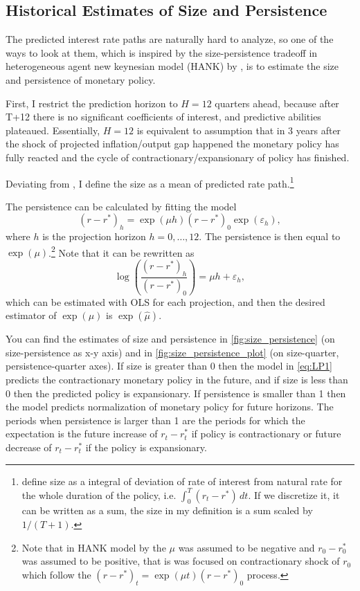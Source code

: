 \documentclass[11pt]{article}
\begin{document}
\subsection{Historical Estimates of Size and Persistence}
\label{sec:size_persistence}


The predicted interest rate paths are naturally hard to analyze, so one of the ways to look at them, which is inspired by the size-persistence tradeoff in heterogeneous agent new keynesian model (HANK) by \citet{KMV2018}, is to estimate the size and persistence of monetary policy. 

First, I restrict the prediction horizon to $H=12$ quarters ahead, because after T+12 there is no significant coefficients of interest, and predictive abilities plateaued. 
Essentially, $H=12$ is equivalent to assumption that in 3 years after the shock of projected inflation/output gap happened the monetary policy has fully reacted and the cycle of contractionary/expansionary of policy has finished.

Deviating from \citet{KMV2018}, I define the size as a mean of predicted rate path.\footnote{\citet{KMV2018} define size as a integral of deviation of rate of interest from natural rate for the whole duration of the policy, i.e. $\int_0^T \left(r_t-r^*\right)\,dt$. If we discretize it, it can be written as a sum, the size in my definition is a sum scaled by $1/(T+1)$.} 

The persistence can be calculated by fitting the model 
\[\left(r-r^*\right)_h=\exp(\mu h)\left(r-r^*\right)_0\exp(\varepsilon_h),\]
where $h$ is the projection horizon $h=0,\dots, 12$. 
The persistence is then equal to $\exp(\mu)$.\footnote{Note that in HANK model by \citet{KMV2018} the $\mu$ was assumed to be negative and $r_0-r_0^*$ was assumed to be positive, that is \citet{KMV2018} was focused on contractionary shock of $r_0$ which follow the $\left(r-r^*\right)_t=\exp(\mu t)\left(r-r^*\right)_0$ process.} Note that it can be rewritten as
\[\log\left(\frac{\left(r-r^*\right)_h}{\left(r-r^*\right)_{0}}\right)=\mu h+\varepsilon_h,\]
which can be estimated with OLS for each projection, and then the desired estimator of $\exp(\mu)$ is $\exp(\hat \mu)$. 


You can find the estimates of size and persistence in \vref{fig:size_persistence} (on size-persistence as x-y axis) and in \vref{fig:size_persistence_plot} (on size-quarter, persistence-quarter axes).
If size is greater than 0 then the model in \vref{eq:LP1} predicts the contractionary monetary policy in the future, and if size is less than 0 then the predicted policy is expansionary. 
If persistence is smaller than 1 then the model predicts normalization of monetary policy for future horizons. 
The periods when persistence is larger than 1 are the periods for which the expectation is the future increase of $r_t-r_t^*$ if policy is contractionary or future decrease of $r_t-r_t^*$ if the policy is expansionary.
\end{document}
